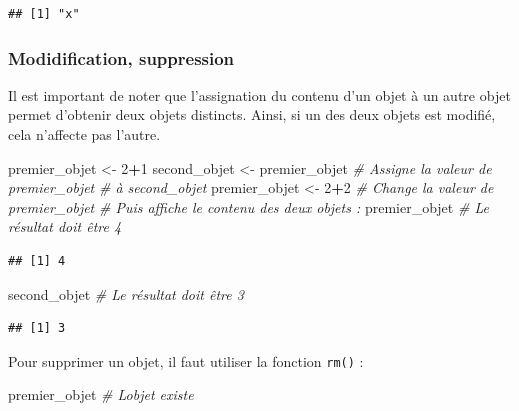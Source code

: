 \documentclass[
  11pt,
]{book}
\newenvironment{Shaded}{\begin{snugshade}}{\end{snugshade}}
\newcommand{\CommentTok}[1]{\textcolor[rgb]{0.56,0.35,0.01}{\textit{#1}}}
\newcommand{\DecValTok}[1]{\textcolor[rgb]{0.00,0.00,0.81}{#1}}
\newcommand{\NormalTok}[1]{#1}
\newcommand{\OperatorTok}[1]{\textcolor[rgb]{0.81,0.36,0.00}{\textbf{#1}}}
\newcommand{\StringTok}[1]{\textcolor[rgb]{0.31,0.60,0.02}{#1}}
\numberwithin{equation}{section}
\numberwithin{countremarque}{section}
\begin{document}
\begin{lstlisting}
## [1] "x"
\end{lstlisting}

\hypertarget{modidification-suppression}{%
\subsubsection{Modidification, suppression}\label{modidification-suppression}}

Il est important de noter que l'assignation du contenu d'un objet à un autre objet permet d'obtenir deux objets distincts. Ainsi, si un des deux objets est modifié, cela n'affecte pas l'autre.

\begin{Shaded}
\begin{Highlighting}[]
\NormalTok{premier\_objet \textless{}{-}}\StringTok{ }\DecValTok{2}\OperatorTok{+}\DecValTok{1}
\NormalTok{second\_objet \textless{}{-}}\StringTok{ }\NormalTok{premier\_objet }\CommentTok{\# Assigne la valeur de premier\_objet}
\CommentTok{\# à second\_objet}
\NormalTok{premier\_objet \textless{}{-}}\StringTok{ }\DecValTok{2}\OperatorTok{+}\DecValTok{2} \CommentTok{\# Change la valeur de premier\_objet}
\CommentTok{\# Puis affiche le contenu des deux objets :}
\NormalTok{premier\_objet }\CommentTok{\# Le résultat doit être 4}
\end{Highlighting}
\end{Shaded}

\begin{lstlisting}
## [1] 4
\end{lstlisting}

\begin{Shaded}
\begin{Highlighting}[]
\NormalTok{second\_objet }\CommentTok{\# Le résultat doit être 3}
\end{Highlighting}
\end{Shaded}

\begin{lstlisting}
## [1] 3
\end{lstlisting}

Pour supprimer un objet, il faut utiliser la fonction \texttt{rm()} :

\begin{Shaded}
\begin{Highlighting}[]
\NormalTok{premier\_objet }\CommentTok{\# L\textquotesingle{}objet existe}
\end{Highlighting}
\end{Shaded}
\end{document}
